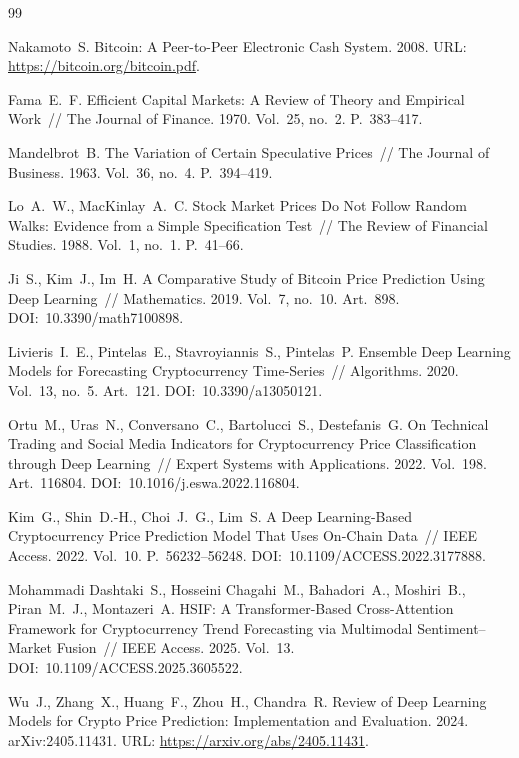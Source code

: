 \documentclass[12pt,a4paper]{report}
\begin{document}
\begin{thebibliography}{99}

 Nakamoto~S. Bitcoin: A Peer-to-Peer Electronic Cash System.
2008. URL: \url{https://bitcoin.org/bitcoin.pdf}.

 Fama~E.~F. Efficient Capital Markets: A Review of Theory and
Empirical Work~// The Journal of Finance. 1970. Vol.~25, no.~2. P.~383--417.

 Mandelbrot~B. The Variation of Certain Speculative
Prices~// The Journal of Business. 1963. Vol.~36, no.~4. P.~394--419.

 Lo~A.~W., MacKinlay~A.~C. Stock Market Prices Do Not Follow Random
Walks: Evidence from a Simple Specification Test~// The Review of Financial Studies.
1988. Vol.~1, no.~1. P.~41--66.

 Ji~S., Kim~J., Im~H. A Comparative Study of Bitcoin Price
Prediction Using Deep Learning~// Mathematics. 2019. Vol.~7, no.~10. Art.~898.
DOI:~10.3390/math7100898.

 Livieris~I.~E., Pintelas~E., Stavroyiannis~S., Pintelas~P.
Ensemble Deep Learning Models for Forecasting Cryptocurrency Time-Series~//
Algorithms. 2020. Vol.~13, no.~5. Art.~121. DOI:~10.3390/a13050121.

 Ortu~M., Uras~N., Conversano~C., Bartolucci~S., Destefanis~G.
On Technical Trading and Social Media Indicators for Cryptocurrency Price
Classification through Deep Learning~// Expert Systems with Applications. 2022.
Vol.~198. Art.~116804. DOI:~10.1016/j.eswa.2022.116804.

 Kim~G., Shin~D.-H., Choi~J.~G., Lim~S. A Deep Learning-Based
Cryptocurrency Price Prediction Model That Uses On-Chain Data~// IEEE Access. 2022.
Vol.~10. P.~56232--56248. DOI:~10.1109/ACCESS.2022.3177888.

 Mohammadi Dashtaki~S., Hosseini Chagahi~M., Bahadori~A.,
Moshiri~B., Piran~M.~J., Montazeri~A. HSIF: A Transformer-Based Cross-Attention
Framework for Cryptocurrency Trend Forecasting via Multimodal Sentiment--Market
Fusion~// IEEE Access. 2025. Vol.~13. DOI:~10.1109/ACCESS.2025.3605522.

 Wu~J., Zhang~X., Huang~F., Zhou~H., Chandra~R. Review of Deep
Learning Models for Crypto Price Prediction: Implementation and Evaluation. 2024.
arXiv:2405.11431. URL: \url{https://arxiv.org/abs/2405.11431}.


\end{thebibliography}
\end{document}
